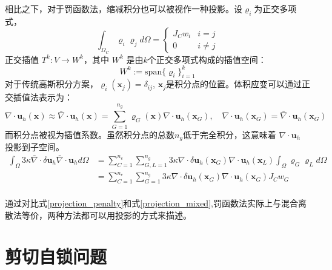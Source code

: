 相比之下，对于罚函数法，缩减积分也可以被视作一种投影。设$\varrho_i$为正交多项式，
\begin{equation}
    \int_{\Omega_C} \varrho_i \varrho_j d\Omega = 
    \begin{cases}
        J_C w_i  & i = j \\
        0 & i \ne j
    \end{cases}
\end{equation}
正交插值 $T^{k}: V \rightarrow W^{k}$，其中 $W^{k}$ 是由$k$个正交多项式构成的插值空间：
\begin{equation}
    W^{k}:= \mathrm{span}\{\varrho_i \}_{i=1}^{k}
\end{equation}
对于传统高斯积分方案，$\varrho_i(\boldsymbol x_j) = \delta_{ij}$, $\boldsymbol x_j$是积分点的位置。体积应变可以通过正交插值法表示为：
\begin{equation}
    \nabla \cdot \boldsymbol u_h(\boldsymbol x) \approx \bar \nabla \cdot \boldsymbol u_h(\boldsymbol x) = \sum_{G=1}^{n_g} \varrho_G(\boldsymbol x) \nabla \cdot \boldsymbol u_h(\boldsymbol x_G), \quad \nabla \cdot \boldsymbol u_h(\boldsymbol x_G) = \bar \nabla \cdot \boldsymbol u_h(\boldsymbol x_G)
\end{equation}
而积分点被视为插值系数。虽然积分点的总数$n_g$低于完全积分，这意味着 $\nabla \cdot \boldsymbol u_h$ 投影到子空间。
\begin{equation}\label{projection_penalty}
    \begin{split}
        \int_\Omega 3\kappa \bar \nabla \cdot \delta \boldsymbol u_h \bar \nabla \cdot \boldsymbol u_h d\Omega
        &= \sum_{C=1}^{n_e} \sum_{G,L=1}^{n_g} 3\kappa \nabla \cdot \delta \boldsymbol u_h(\boldsymbol x_G) \nabla \cdot \boldsymbol u_h(\boldsymbol x_L) \int_\Omega \varrho_G \varrho_L d\Omega  \\
        &= \sum_{C=1}^{n_e} \sum_{G=1}^{n_g} 3\kappa \nabla \cdot \delta \boldsymbol u_h(\boldsymbol x_G) \nabla \cdot \boldsymbol u_h(\boldsymbol x_G) J_C w_G \\
    \end{split}
\end{equation}

通过对比式\eqref{projection_penalty}和式\eqref{projection_mixed},罚函数法实际上与混合离散法等价，两种方法都可以用投影的方式来描述。

\section{剪切自锁问题}      
